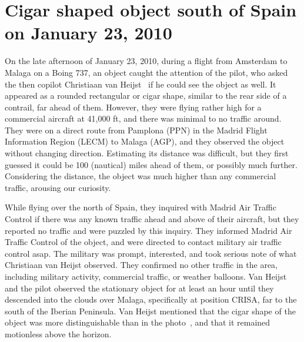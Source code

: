 \clearpage




\section{Cigar shaped object south of Spain on January 23,  2010}
\label{2023-UFO-part-History-photos-2010-csssp}

On the late afternoon of January 23, 2010, during a flight from Amsterdam to Malaga on a Boing 737, an object caught
the attention of the pilot, who asked the then copilot Christiaan van Heijst~\cite{vanHeijst2010Jan,Heijst2023Feb}
if he could see the object as well.
It appeared as a rounded rectangular or cigar shape, similar to the rear side of a contrail, far ahead of them.
However, they were flying rather high for a commercial aircraft at 41,000 ft,
and there was minimal to no traffic around.
They were on a direct route from Pamplona (PPN) in the Madrid Flight Information Region (LECM) to Malaga (AGP),
and they observed the object without changing direction.
Estimating its distance was difficult, but they first guessed it could be 100 (nautical) miles ahead of them,
or possibly much further.
Considering the distance, the object was much higher than any commercial traffic, arousing our curiosity.

While flying over the north of Spain, they inquired with Madrid Air Traffic Control
if there was any known traffic ahead and above of their aircraft, but they reported no traffic and were puzzled by this inquiry.
They informed Madrid Air Traffic Control of the object, and were directed to contact military air traffic control asap.
The military was prompt, interested, and took serious note of what Christiaan van Heijst observed.
They confirmed no other traffic in the area, including military activity, commercial traffic, or weather balloons.
Van Heijst and the pilot observed the stationary object for at least an hour until they descended into the clouds over Malaga,
specifically at position CRISA, far to the south of the Iberian Peninsula.
Van Heijst mentioned that the cigar shape of the object was more distinguishable than in the photo~\cite{vanHeijst2010Jan},
and that it remained motionless above the horizon.



